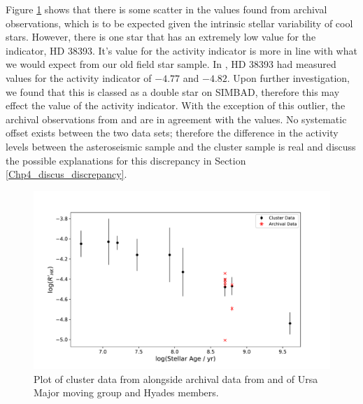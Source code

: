 Figure \ref{fig:cluster_data_comparison} shows that there is some scatter in the \Rprime values found from archival observations, which is to be expected given the intrinsic stellar variability of cool stars. However, there is one star that has an extremely low value for the \Rprime indicator, HD 38393. It's value for the \Rprime activity indicator is more in line with what we would expect from our old field star sample. In \citet{Mamajek_Hillenbrand_2008}, HD 38393 had measured values for the \Rprime activity indicator of $-4.77$ and $-4.82$. Upon further investigation, we found that this is classed as a double star on SIMBAD, therefore this may effect the value of the \Rprime activity indicator. With the exception of this outlier, the archival observations from \esp and \narval are in agreement with the \citet{Mamajek_Hillenbrand_2008} values. No systematic offset exists between the two data sets; therefore the difference in the activity levels between the asteroseismic sample and the cluster sample is real and discuss the possible explanations for this discrepancy in Section \ref{Chp4_discus_discrepancy}.

\begin{figure}
    \centering
    \includegraphics[scale=0.5]{Figures/4-Chromospheric_age/cluster_data.pdf}
    \caption[Analysis of cluster members]{Plot of cluster data from \citet{Mamajek_Hillenbrand_2008} alongside archival data from \esp and \narval of Ursa Major moving group and Hyades members.}
    \label{fig:cluster_data_comparison}
\end{figure}

